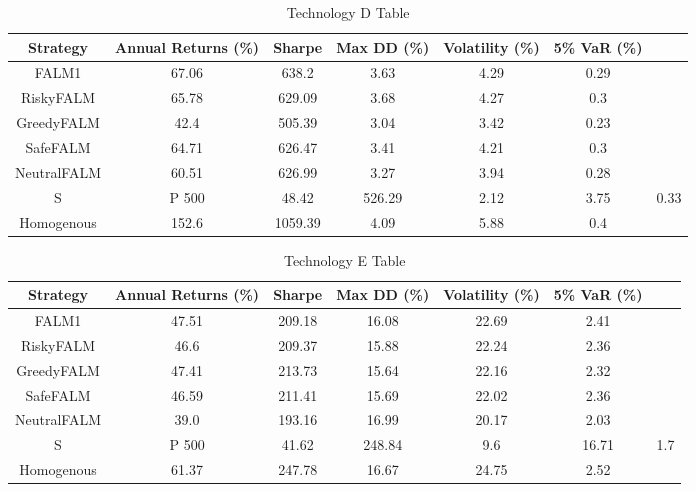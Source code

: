 \begin{table}[]
    \centering
    \caption{Technology D Table}
    \begin{tabular}{|c|c|c|c|c|c|c|}
        \hline
        Strategy & Annual Returns (\%) & Sharpe & Max \ac{DD} (\%) & Volatility (\%)& 5\% \ac{VaR} (\%) \\
        \hline
        FALM1 & 67.06 & 638.2 & 3.63 & 4.29 & 0.29 \\
        RiskyFALM & 65.78 & 629.09 & 3.68 & 4.27 & 0.3 \\
        GreedyFALM & 42.4 & 505.39 & 3.04 & 3.42 & 0.23 \\
        SafeFALM & 64.71 & 626.47 & 3.41 & 4.21 & 0.3 \\
        NeutralFALM & 60.51 & 626.99 & 3.27 & 3.94 & 0.28 \\
        S&P 500 & 48.42 & 526.29 & 2.12 & 3.75 & 0.33 \\
        Homogenous & 152.6 & 1059.39 & 4.09 & 5.88 & 0.4 \\
        \hline
    \end{tabular}
    \label{tab:technology_d_table}
\end{table}

\begin{table}[]
    \centering
    \caption{Technology E Table}
    \begin{tabular}{|c|c|c|c|c|c|c|}
        \hline
        Strategy & Annual Returns (\%) & Sharpe & Max \ac{DD} (\%) & Volatility (\%)& 5\% \ac{VaR} (\%) \\
        \hline
        FALM1 & 47.51 & 209.18 & 16.08 & 22.69 & 2.41 \\
        RiskyFALM & 46.6 & 209.37 & 15.88 & 22.24 & 2.36 \\
        GreedyFALM & 47.41 & 213.73 & 15.64 & 22.16 & 2.32 \\
        SafeFALM & 46.59 & 211.41 & 15.69 & 22.02 & 2.36 \\
        NeutralFALM & 39.0 & 193.16 & 16.99 & 20.17 & 2.03 \\
        S&P 500 & 41.62 & 248.84 & 9.6 & 16.71 & 1.7 \\
        Homogenous & 61.37 & 247.78 & 16.67 & 24.75 & 2.52 \\
        \hline
    \end{tabular}
    \label{tab:technology_e_table}
\end{table}


